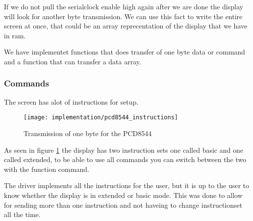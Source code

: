 If we do not pull the serialclock enable high again after we are done the display will look for another byte transmission.
We can use this fact to write the entire screen at once, that could be an array reprecentation of the display that we have in ram.


We have implementet functions that does transfer of one byte data or command and a function that can transfer a data array.


\subsubsection{Commands}
The screen has alot of instructions for setup.

\begin{figure}
	\centering
	\texttt{[image: implementation/pcd8544\_instructions]}
	\caption{Transmission of one byte for the PCD8544\cite[p. 12]{philips:pcd8544}}
	\label{fig:pcd8544_Instructions}
\end{figure}

As seen in figure \ref{fig:pcd8544_Instructions} the display has two instruction sets
one called basic and one called extended, to be able to use all commands you can switch between the two with the function command.

The driver implements all the instructions for the user, but it is up to the user to know whether the display is in extended or basic mode.
This was done to allow for sending more than one instruction and not haveing to change instructionset all the time.
